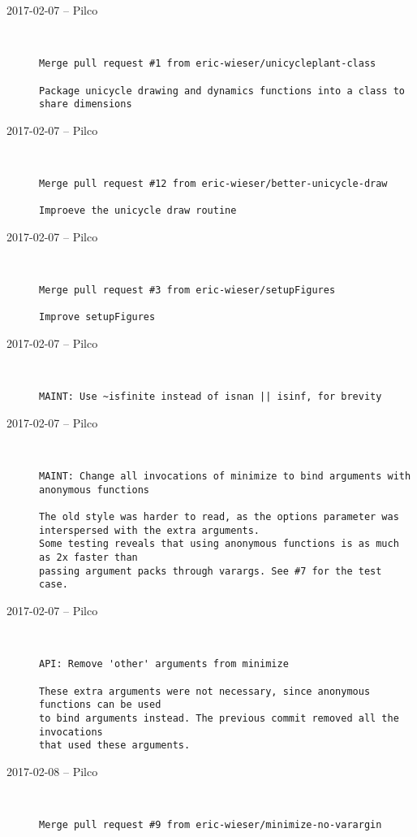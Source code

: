 \begin{description}
  \item[2017-02-07 -- Pilco] \hfill \
\begin{lstlisting}
Merge pull request #1 from eric-wieser/unicycleplant-class

Package unicycle drawing and dynamics functions into a class to share dimensions\end{lstlisting}


  \item[2017-02-07 -- Pilco] \hfill \
\begin{lstlisting}
Merge pull request #12 from eric-wieser/better-unicycle-draw

Improeve the unicycle draw routine\end{lstlisting}


  \item[2017-02-07 -- Pilco] \hfill \
\begin{lstlisting}
Merge pull request #3 from eric-wieser/setupFigures

Improve setupFigures\end{lstlisting}


  \item[2017-02-07 -- Pilco] \hfill \
\begin{lstlisting}
MAINT: Use ~isfinite instead of isnan || isinf, for brevity
\end{lstlisting}


  \item[2017-02-07 -- Pilco] \hfill \
\begin{lstlisting}
MAINT: Change all invocations of minimize to bind arguments with anonymous functions

The old style was harder to read, as the options parameter was
interspersed with the extra arguments.
Some testing reveals that using anonymous functions is as much as 2x faster than
passing argument packs through varargs. See #7 for the test case.
\end{lstlisting}


  \item[2017-02-07 -- Pilco] \hfill \
\begin{lstlisting}
API: Remove 'other' arguments from minimize

These extra arguments were not necessary, since anonymous functions can be used
to bind arguments instead. The previous commit removed all the invocations
that used these arguments.
\end{lstlisting}


  \item[2017-02-08 -- Pilco] \hfill \
\begin{lstlisting}
Merge pull request #9 from eric-wieser/minimize-no-varargin


\end{lstlisting}
\end{description}

